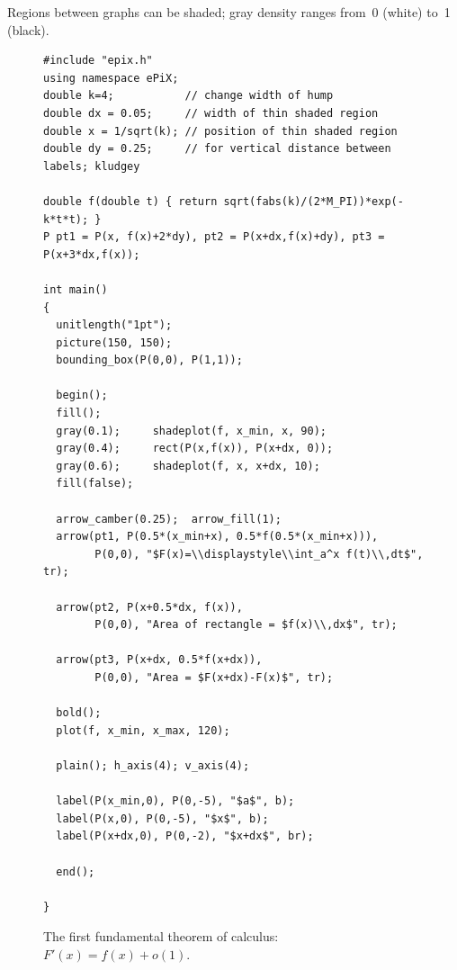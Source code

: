 \documentclass[11pt]{article}
\begin{document}
\clearpage

\noindent Regions between graphs can be shaded; gray density ranges
from~0 (white) to~1 (black).

\begin{figure}[hbt]
\begin{center}

\vspace*{-170pt}
\begin{footnotesize}
\begin{verbatim}
#include "epix.h"
using namespace ePiX;
double k=4;           // change width of hump
double dx = 0.05;     // width of thin shaded region
double x = 1/sqrt(k); // position of thin shaded region
double dy = 0.25;     // for vertical distance between labels; kludgey

double f(double t) { return sqrt(fabs(k)/(2*M_PI))*exp(-k*t*t); }
P pt1 = P(x, f(x)+2*dy), pt2 = P(x+dx,f(x)+dy), pt3 = P(x+3*dx,f(x));

int main() 
{
  unitlength("1pt");
  picture(150, 150);
  bounding_box(P(0,0), P(1,1));

  begin();
  fill(); 
  gray(0.1);     shadeplot(f, x_min, x, 90);
  gray(0.4);     rect(P(x,f(x)), P(x+dx, 0));
  gray(0.6);     shadeplot(f, x, x+dx, 10);
  fill(false);

  arrow_camber(0.25);  arrow_fill(1);
  arrow(pt1, P(0.5*(x_min+x), 0.5*f(0.5*(x_min+x))),
        P(0,0), "$F(x)=\\displaystyle\\int_a^x f(t)\\,dt$", tr);

  arrow(pt2, P(x+0.5*dx, f(x)), 
        P(0,0), "Area of rectangle = $f(x)\\,dx$", tr);

  arrow(pt3, P(x+dx, 0.5*f(x+dx)), 
        P(0,0), "Area = $F(x+dx)-F(x)$", tr);

  bold();
  plot(f, x_min, x_max, 120);

  plain(); h_axis(4); v_axis(4);

  label(P(x_min,0), P(0,-5), "$a$", b);
  label(P(x,0), P(0,-5), "$x$", b);
  label(P(x+dx,0), P(0,-2), "$x+dx$", br);

  end();

}
\end{verbatim}
\end{footnotesize}
\caption{The first fundamental theorem of calculus: $F'(x)=f(x)+o(1)$.}
\label{fig:shadeplot}
\end{center}
\end{figure}
\end{document}
